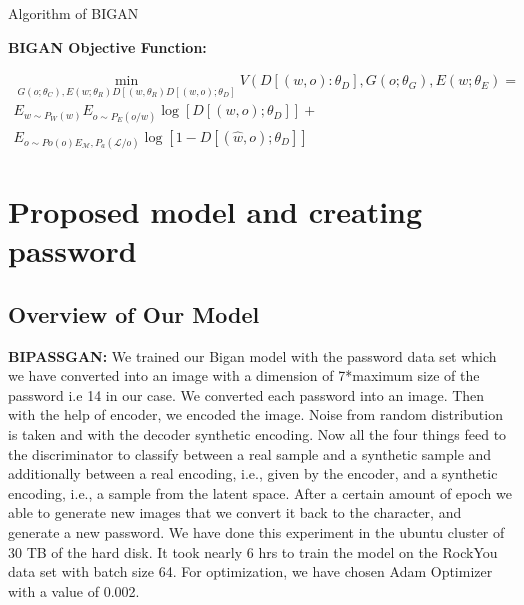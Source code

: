 \documentclass[runningheads]{llncs}
\begin{document}
{\begin{algorithm*}[H]
\begin{algorithmic}[1]
 \caption{Algorithm of BIGAN}    
\end{algorithmic}
\end{algorithm*}
\hfill \break
\textbf{BIGAN Objective Function:}

\begin{equation}
\begin{array}{c}
{\min _{G\left(o ; \theta_{C}\right), E\left(w ; \theta_{R}\right) D\left[\left(w, \theta_{R}\right) D\left[(w, o) ; \theta_{D}\right]\right.} V\left(D\left[(w, o): \theta_{D}\right], G\left(o ; \theta_{G}\right), E\left(w ; \theta_{E}\right)=\right.} \\
{E_{w \sim P_{W}(w)} E_{o \sim P_{E}(o / w)} \log \left[D\left[(w, o) ; \theta_{D}\right]\right]+} \\
{E_{o \sim P o(o) E_{\mathcal{M}}, P_{a}(\mathcal{L} / o)} \log \left[1-D\left[(\hat{w}, o) ; \theta_{D}\right]\right]}
\end{array}
\end{equation}

\par
\section{Proposed model and creating password }
\subsection{Overview of Our Model}
\newline
\textbf{BIPASSGAN: }We trained our Bigan model with the password data set which we have converted into an image with a dimension of 7*maximum size of the password i.e 14 in our case. We converted each password into an image. Then with the help of encoder, we encoded the image.
Noise from random distribution is taken and with the decoder synthetic encoding. Now all the four things feed to the discriminator to classify between a real sample and a synthetic sample and additionally between a real encoding, i.e., given by the encoder, and a synthetic encoding, i.e., a sample from the latent space. After a certain amount of epoch we able to generate new images that we convert it back to the character, and generate a new password. We have done this experiment in the ubuntu cluster of 30 TB of the hard disk. It took nearly 6 hrs to train the model on the RockYou data set with batch size 64. For optimization, we have chosen Adam Optimizer with a value of 0.002.


}
\end{document}
